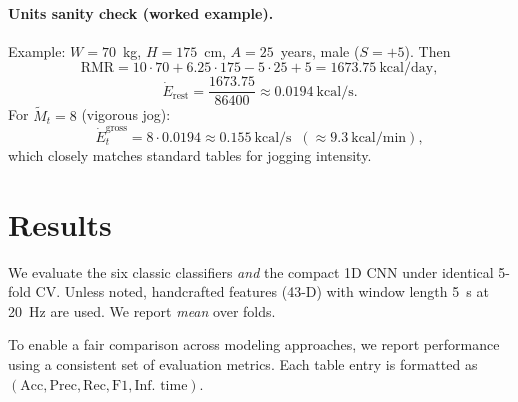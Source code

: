 \documentclass[10pt,twocolumn]{article}
\begin{document}
\paragraph{Units sanity check (worked example).}
Example: $W=70$~kg, $H=175$~cm, $A=25$~years, male ($S=+5$).  
Then
\[
\mathrm{RMR} = 10\cdot70 + 6.25\cdot175 - 5\cdot25 + 5 = 1673.75~\mathrm{kcal/day},
\]
\[
\dot{E}_{\mathrm{rest}} = \frac{1673.75}{86400} \approx 0.0194~\mathrm{kcal/s}.
\]
For $\widetilde{M}_t=8$ (vigorous jog):
\[
\dot{E}^{\text{gross}}_t = 8 \cdot 0.0194 \approx 0.155~\mathrm{kcal/s} \;\;(\approx 9.3~\mathrm{kcal/min}),
\]
which closely matches standard tables for jogging intensity.


\section{Results}
\label{sec:results}
We evaluate the six classic classifiers \emph{and} the compact 1D CNN under identical 5-fold CV. Unless noted, handcrafted features (43-D) with window length \SI{5}{s} at \SI{20}{Hz} are used. We report \emph{mean} over folds.

To enable a fair comparison across modeling approaches, we report performance using a consistent set of evaluation metrics. Each table entry is formatted as \((\text{Acc}, \text{Prec}, \text{Rec}, \text{F1}, \text{Inf. time})\).

\begin{table}[H]
\centering
\scriptsize
{}
\caption{5-fold CV performance using handcrafted 43-D features (5\,s windows, 1\,s stride). Metrics are mean $\pm$ std across folds (in \%), inference time reported as mean $\pm$ std (ms/sample).}
\label{tab:handcrafted}
\end{table}
\end{document}
